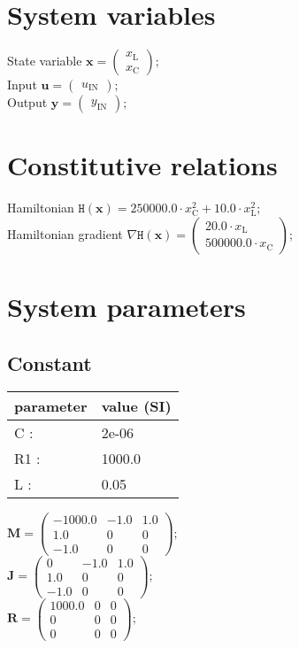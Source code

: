 \documentclass[11pt, oneside]{article}      %
\begin{document}
\section{System variables}
%
State variable $ \mathbf{x} = \left(\begin{array}{c}x_{\mathrm{L}}\\x_{\mathrm{C}}\end{array}\right) ; $ 
%
\\
%
Input $ \mathbf{u} = \left(\begin{array}{c}u_{\mathrm{IN}}\end{array}\right) ; $ 
%
\\
%
Output $ \mathbf{y} = \left(\begin{array}{c}y_{\mathrm{IN}}\end{array}\right) ; $ 
%
\\
%
%
\section{Constitutive relations}
%
Hamiltonian $ \mathtt{H}(\mathbf{x}) = 250000.0 \cdot x_{\mathrm{C}}^{2} + 10.0 \cdot x_{\mathrm{L}}^{2} ; $ 
%
\\
%
Hamiltonian gradient $ \nabla \mathtt{H}(\mathbf{x}) = \left(\begin{array}{c}20.0 \cdot x_{\mathrm{L}}\\500000.0 \cdot x_{\mathrm{C}}\end{array}\right) ; $ 
%
\\
%
%
\section{System parameters}
%
%
\subsection{Constant}
%
\begin{center}
%
\begin{tabular}{ll}
%
\hline
parameter & value (SI)
\\ \hline
C :& 2e-06
\\
R1 :& 1000.0
\\
L :& 0.05
\\
\hline
\end{tabular}
%
\end{center}
%
$ \mathbf{M} = \left(\begin{array}{ccc}-1000.0 & -1.0 & 1.0\\1.0 & 0 & 0\\-1.0 & 0 & 0\end{array}\right) ; $ 
%
\\
%
$ \mathbf{J} = \left(\begin{array}{ccc}0 & -1.0 & 1.0\\1.0 & 0 & 0\\-1.0 & 0 & 0\end{array}\right) ; $ 
%
\\
%
$ \mathbf{R} = \left(\begin{array}{ccc}1000.0 & 0 & 0\\0 & 0 & 0\\0 & 0 & 0\end{array}\right) ; $ 
%
\\
%
\end{document}
